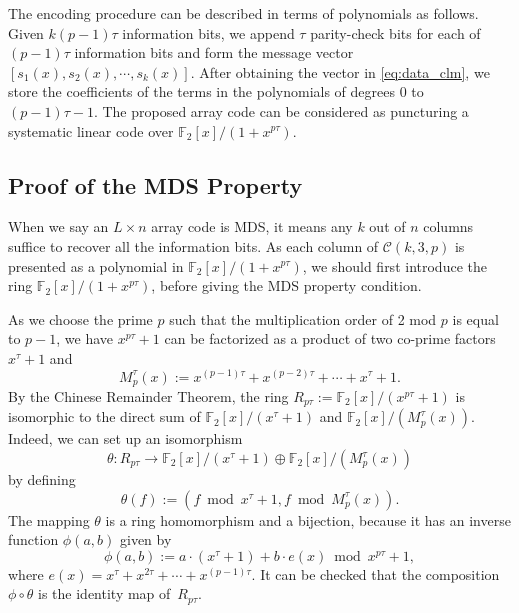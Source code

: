 \documentclass[conference]{IEEEtran}
\begin{document}
The encoding procedure can be described in terms of polynomials as follows. Given $k(p-1)\tau$ information bits, we append $\tau$ parity-check bits for each of $(p-1)\tau$ information bits and form the message vector $[s_1(x),s_2(x),\cdots,s_{k}(x)]$.
After obtaining the vector in \eqref{eq:data_clm},
 we store the coefficients of the terms in the polynomials of degrees 0 to $(p-1)\tau-1$.
The proposed array code can be considered as puncturing a systematic linear code over $\mathbb{F}_2[x]/(1+x^{p\tau})$.



\subsection{Proof of the MDS Property}
\label{sec:mds}
When we say an $L \times n$ array code is MDS, it means any $k$ out of $n$ columns suffice to recover all the information bits. As each column of $\mathcal{C}(k,3,p)$ is presented as a polynomial in $\mathbb{F}_2[x]/(1+x^{p\tau})$, we should first introduce the ring $\mathbb{F}_2[x]/(1+x^{p\tau})$, before giving the MDS property condition.

As we choose the prime $p$ such that the multiplication order of 2 mod $p$ is equal to $p-1$, we have $x^{p\tau}+1$ can be factorized as a product of two co-prime factors $x^{\tau}+1$ and
\[
M_p^{\tau}(x):=x^{(p-1)\tau}+x^{(p-2)\tau}+\cdots+x^{\tau}+1.
\]
By the Chinese Remainder Theorem, the ring $R_{p\tau}:=\mathbb{F}_{2}[x]/(x^{p\tau}+1)$ is isomorphic to the direct sum of $\mathbb{F}_2[x]/(x^{\tau}+1)$ and $\mathbb{F}_2[x]/(M_p^{\tau}(x))$. Indeed, we can set up an isomorphism
$$\theta: R_{p\tau} \rightarrow \mathbb{F}_2[x]/(x^{\tau}+1) \oplus \mathbb{F}_2[x]/(M_p^{\tau}(x))$$
by defining
\[
 \theta(f) := (f \bmod x^{\tau}+1, f \bmod M_p^{\tau}(x)).
\]
The mapping $\theta$ is a ring homomorphism and a bijection, because it has an inverse function $\phi(a,b)$  given by
\[
\phi(a,b) := a \cdot (x^{\tau}+1) + b \cdot e(x) \bmod x^{p\tau}+1,
\]
where $e(x) = x^{\tau} + x^{2\tau} + \cdots + x^{(p-1)\tau}$.
It can be checked that the composition $\phi \circ \theta$ is the identity map of~$R_{p\tau}$.
\end{document}
